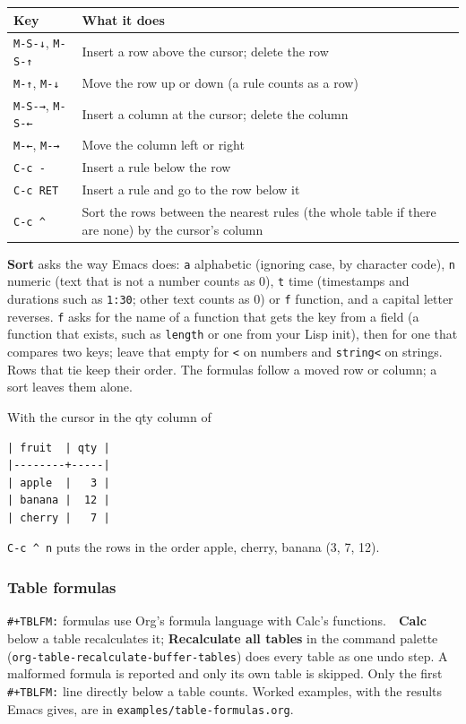 \documentclass[11pt]{article}
\begin{document}
\begin{center}
\begin{tabular}{ll}
Key & What it does\\[0pt]
\hline
\texttt{M-S-↓}, \texttt{M-S-↑} & Insert a row above the cursor; delete the row\\[0pt]
\texttt{M-↑}, \texttt{M-↓} & Move the row up or down (a rule counts as a row)\\[0pt]
\texttt{M-S-→}, \texttt{M-S-←} & Insert a column at the cursor; delete the column\\[0pt]
\texttt{M-←}, \texttt{M-→} & Move the column left or right\\[0pt]
\texttt{C-c -} & Insert a rule below the row\\[0pt]
\texttt{C-c RET} & Insert a rule and go to the row below it\\[0pt]
\texttt{C-c \textasciicircum{}} & Sort the rows between the nearest rules (the whole table if there are none) by the cursor's column\\[0pt]
\end{tabular}
\end{center}

\textbf{Sort} asks the way Emacs does: \texttt{a} alphabetic (ignoring case, by character code), \texttt{n} numeric (text that is not a number counts as 0), \texttt{t} time (timestamps and durations such as \texttt{1:30}; other text counts as 0) or \texttt{f} function, and a capital letter reverses. \texttt{f} asks for the name of a function that gets the key from a field (a function that exists, such as \texttt{length} or one from your Lisp init), then for one that compares two keys; leave that empty for \texttt{<} on numbers and \texttt{string<} on strings. Rows that tie keep their order. The formulas follow a moved row or column; a sort leaves them alone.

With the cursor in the qty column of

\begin{verbatim}
| fruit  | qty |
|--------+-----|
| apple  |   3 |
| banana |  12 |
| cherry |   7 |
\end{verbatim}

\texttt{C-c \textasciicircum{} n} puts the rows in the order apple, cherry, banana (3, 7, 12).

\subsubsection{Table formulas}
\label{sec:org7d24a5b}
\texttt{\#+TBLFM:} formulas use Org's formula language with Calc's functions. \textbf{🔢 Calc} below a table recalculates it; \textbf{Recalculate all tables} in the command palette (\texttt{org-table-recalculate-buffer-tables}) does every table as one undo step. A malformed formula is reported and only its own table is skipped. Only the first \texttt{\#+TBLFM:} line directly below a table counts. Worked examples, with the results Emacs gives, are in \texttt{examples/table-formulas.org}.
\end{document}
